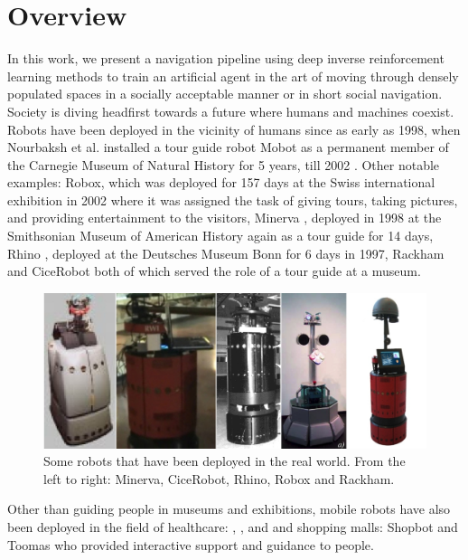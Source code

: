 \label{ch:introduction}
\section{Overview}
In this work, we present a navigation pipeline using deep inverse reinforcement learning methods to train an artificial agent in the art of moving through densely populated spaces in a socially acceptable manner or in short social navigation.\\
Society is diving headfirst towards a future where humans and machines coexist. Robots have been deployed in the vicinity of humans since as early as 1998, when Nourbaksh et al. installed a tour guide robot Mobot as a permanent member of the Carnegie Museum of Natural History for 5 years, till 2002 \cite{Nourbaksh2003Movot}. Other notable examples: Robox, \cite{siciliano_robox_2003} which was deployed for 157 days at the Swiss international exhibition in 2002 where it was assigned the task of giving tours, taking pictures, and providing entertainment to the visitors, Minerva \cite{minerva_thrun_2000}, deployed in 1998 at the Smithsonian Museum of American History again as a tour guide for 14 days, Rhino \cite{fox_dynamic_1997}, deployed at the Deutsches Museum Bonn for 6 days in 1997, Rackham \cite{rackham_clodic_2006} and CiceRobot \cite{chella_perception_2009} both of which served the role of a tour guide at a museum.\\
\vspace{3cm}
\begin{figure}
	\label{fig:real-world-robots}
	\centering
	\includegraphics[width=\linewidth]{figures/minerva_cice_rhino_robox_rackham.jpg}
	\caption{Some robots that have been deployed in the real world. From the left to right: Minerva, CiceRobot, Rhino, Robox and Rackham.}
\end{figure}

Other than guiding people in museums and exhibitions, mobile robots have also been deployed in the field of healthcare: \cite{pearl_pollack_2002}, \cite{kim_socially_2016}, and \cite{kuderer_feature-based_nodate} and shopping malls: Shopbot \cite{shopbot_kanada} and Toomas \cite{toomas_gross_2009} who provided interactive support and guidance to people. 

